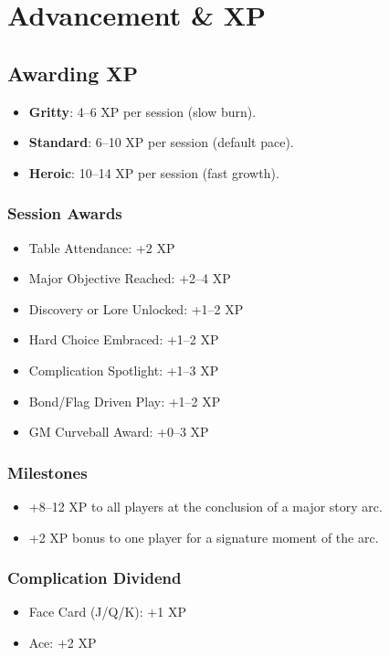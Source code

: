 \documentclass[11pt]{article}
\begin{document}
\section{Advancement \& XP}

\subsection{Awarding XP}
\begin{itemize}
    \item \textbf{Gritty}: 4–6 XP per session (slow burn).
    \item \textbf{Standard}: 6–10 XP per session (default pace).
    \item \textbf{Heroic}: 10–14 XP per session (fast growth).
\end{itemize}

\subsubsection{Session Awards}
\begin{itemize}
    \item Table Attendance: +2 XP
    \item Major Objective Reached: +2–4 XP
    \item Discovery or Lore Unlocked: +1–2 XP
    \item Hard Choice Embraced: +1–2 XP
    \item Complication Spotlight: +1–3 XP
    \item Bond/Flag Driven Play: +1–2 XP
    \item GM Curveball Award: +0–3 XP
\end{itemize}

\subsubsection{Milestones}
\begin{itemize}
    \item +8–12 XP to all players at the conclusion of a major story arc.
    \item +2 XP bonus to one player for a signature moment of the arc.
\end{itemize}

\subsubsection{Complication Dividend}
\begin{itemize}
    \item Face Card (J/Q/K): +1 XP
    \item Ace: +2 XP
\end{itemize}
\end{document}
